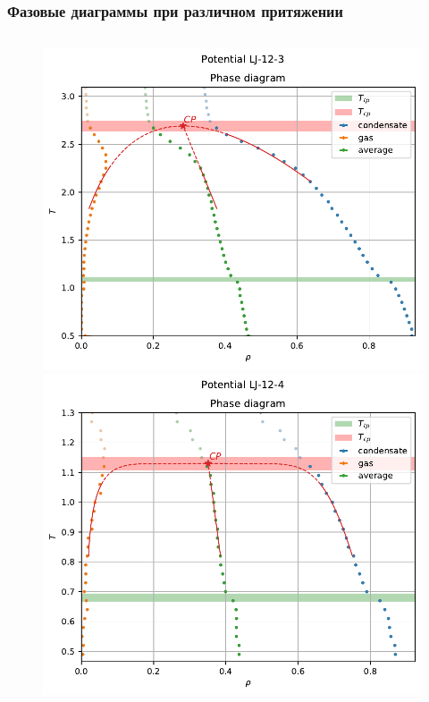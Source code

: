 \documentclass[pdf,hyperref={unicode}]{beamer}
\begin{document}
\begin{frame}
\transdissolve[duration=0.2]
\frametitle{Фазовые диаграммы при различном притяжении}

\begin{columns}

\begin{column}{0.72\linewidth}
{
\begin{figure}[h]
\begin{center}
\begin{minipage}[h]{0.47\linewidth}
\includegraphics[width=\textwidth, keepaspectratio]{plot_phase_diagram_Potential LJ-12-3_1}
\end{minipage}
\begin{minipage}[h]{0.47\linewidth}
\includegraphics[width=\textwidth, keepaspectratio]{plot_phase_diagram_Potential LJ-12-4_1}
\end{minipage}


\end{center}
\end{figure}}
\end{column}
\end{columns}
\end{frame}
\end{document}
